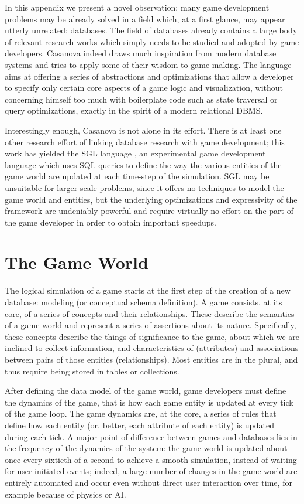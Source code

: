 In this appendix we present a novel observation: many game development problems may be already solved in a field which, at a first glance, may appear utterly unrelated: databases. The field of databases already contains a large body of relevant research works which simply needs to be studied and adopted by game developers. Casanova indeed draws much inspiration from modern database systems and tries to apply some of their wisdom to game making. The language aims at offering a series of abstractions and optimizations that allow a developer to specify only certain core aspects of a game logic and visualization, without concerning himself too much with boilerplate code such as state traversal or query optimizations, exactly in the spirit of a modern relational DBMS.

Interestingly enough, Casanova is not alone in its effort. There is at least one other research effort of linking database research with game development; this work has yielded the SGL language \cite{SGL}, an experimental game development language which uses SQL queries to define the way the various entities of the game world are updated at each time-step of the simulation. SGL may be unsuitable for larger scale problems, since it offers no techniques to model the game world and entities, but the underlying optimizations and expressivity of the framework are undeniably powerful and require virtually no effort on the part of the game developer in order to obtain important speedups.


\section{The Game World}
The logical simulation of a game starts at the first step of the creation of a new database: modeling (or conceptual schema definition). A game consists, at its core, of a series of concepts and their relationships. These describe the semantics of a game world and represent a series of assertions about its nature. Specifically, these concepts describe the things of significance to the game, about which we are inclined to collect information, and characteristics of (attributes) and associations between pairs of those entities (relationships). Most entities are in the plural, and thus require being stored in tables or collections.

After defining the data model of the game world, game developers must define the dynamics of the game, that is how each game entity is updated at every tick of the game loop. The game dynamics are, at the core, a series of rules that define how each entity (or, better, each attribute of each entity) is updated during each tick. A major point of difference between games and databases lies in the frequency of the dynamics of the system: the game world is updated about once every sixtieth of a second to achieve a smooth simulation, instead of waiting for user-initiated events; indeed, a large number of changes in the game world are entirely automated and occur even without direct user interaction over time, for example because of physics or AI.

